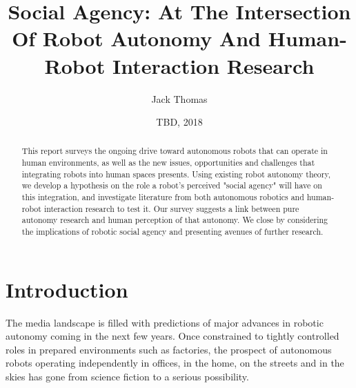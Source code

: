 \documentclass{sfuthesis}
\title{Social Agency: At The Intersection Of Robot Autonomy And Human-Robot Interaction Research}
\author{Jack Thomas}
\date{TBD, 2018}
\begin{document}
\frontmatter
\maketitle{}
\makecommittee{}


\begin{abstract}
This report surveys the ongoing drive toward autonomous robots that can operate in human environments, as well as the new issues, opportunities and challenges that integrating robots into human spaces presents. Using existing robot autonomy theory, we develop a hypothesis on the role a robot's perceived "social agency" will have on this integration, and investigate literature from both autonomous robotics and human-robot interaction research to test it. Our survey suggests a link between pure autonomy research and human perception of that autonomy. We close by considering the implications of robotic social agency and presenting avenues of further research.
\end{abstract}





%
\tableofcontents%
\clearpage


%
\listoffigures%
\clearpage





%
%

\mainmatter%

\chapter{Introduction}

The media landscape is filled with predictions of major advances in robotic autonomy coming in the next few years. Once constrained to tightly controlled roles in prepared environments such as factories, the prospect of autonomous robots operating independently in offices, in the home, on the streets and in the skies has gone from science fiction to a serious possibility.
\end{document}
